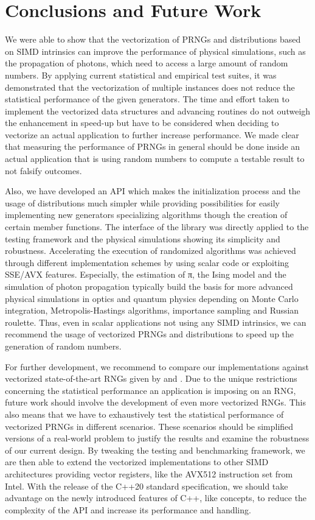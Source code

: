 \documentclass[crop=false]{stdlocal}
\begin{document}
\section{Conclusions and Future Work} %
\label{sec:conclusions}
  We were able to show that the vectorization of PRNGs and distributions based on SIMD intrinsics can improve the performance of physical simulations, such as the propagation of photons, which need to access a large amount of random numbers.
  By applying current statistical and empirical test suites, it was demonstrated that the vectorization of multiple instances does not reduce the statistical performance of the given generators.
  The time and effort taken to implement the vectorized data structures and advancing routines do not outweigh the enhancement in speed-up but have to be considered when deciding to vectorize an actual application to further increase performance.
  We made clear that measuring the performance of PRNGs in general should be done inside an actual application that is using random numbers to compute a testable result to not falsify outcomes.

  Also, we have developed an API which makes the initialization process and the usage of distributions much simpler while providing possibilities for easily implementing new generators specializing algorithms though the creation of certain member functions.
  The interface of the library was directly applied to the testing framework and the physical simulations showing its simplicity and robustness.
  Accelerating the execution of randomized algorithms was achieved through different implementation schemes by using scalar code or exploiting SSE/AVX features.
  Especially, the estimation of π, the Ising model and the simulation of photon propagation typically build the basis for more advanced physical simulations in optics and quantum physics depending on Monte Carlo integration, Metropolis-Hastings algorithms, importance sampling and Russian roulette.
  Thus, even in scalar applications not using any SIMD intrinsics, we can recommend the usage of vectorized PRNGs and distributions to speed up the generation of random numbers.

  For further development, we recommend to compare our implementations against vectorized state-of-the-art RNGs given by  and .
  Due to the unique restrictions concerning the statistical performance an application is imposing on an RNG, future work should involve the development of even more vectorized RNGs.
  This also means that we have to exhaustively test the statistical performance of vectorized PRNGs in different scenarios.
  These scenarios should be simplified versions of a real-world problem to justify the results and examine the robustness of our current design.
  By tweaking the testing and benchmarking framework, we are then able to extend the vectorized implementations to other SIMD architectures providing vector registers, like the AVX512 instruction set from Intel.
  With the release of the C++20 standard specification, we should take advantage on the newly introduced features of C++, like concepts, to reduce the complexity of the API and increase its performance and handling.
\end{document}
